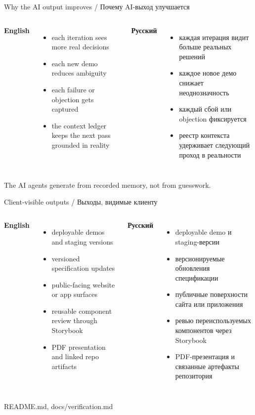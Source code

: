 \documentclass[aspectratio=169]{beamer}
\newcommand{\BilingualFrame}[4]{
  \begin{frame}{#1}
    \small
    \begin{columns}[T,onlytextwidth]
      \column{0.48\textwidth}
      \textbf{English}
      #2
      \column{0.48\textwidth}
      \textbf{Русский}
      #3
    \end{columns}
    \vfill
    {\tiny #4}
  \end{frame}
}
\begin{document}
\BilingualFrame
  {Why the AI output improves / Почему AI-выход улучшается}
  {
    \begin{itemize}
      \item each iteration sees more real decisions
      \item each new demo reduces ambiguity
      \item each failure or objection gets captured
      \item the context ledger keeps the next pass grounded in reality
    \end{itemize}
  }
  {
    \begin{itemize}
      \item каждая итерация видит больше реальных решений
      \item каждое новое демо снижает неоднозначность
      \item каждый сбой или objection фиксируется
      \item реестр контекста удерживает следующий проход в реальности
    \end{itemize}
  }
  {The AI agents generate from recorded memory, not from guesswork.}

\BilingualFrame
  {Client-visible outputs / Выходы, видимые клиенту}
  {
    \begin{itemize}
      \item deployable demos and staging versions
      \item versioned specification updates
      \item public-facing website or app surfaces
      \item reusable component review through Storybook
      \item PDF presentation and linked repo artifacts
    \end{itemize}
  }
  {
    \begin{itemize}
      \item deployable demo и staging-версии
      \item версионируемые обновления спецификации
      \item публичные поверхности сайта или приложения
      \item ревью переиспользуемых компонентов через Storybook
      \item PDF-презентация и связанные артефакты репозитория
    \end{itemize}
  }
  {README.md, docs/verification.md}
\end{document}
